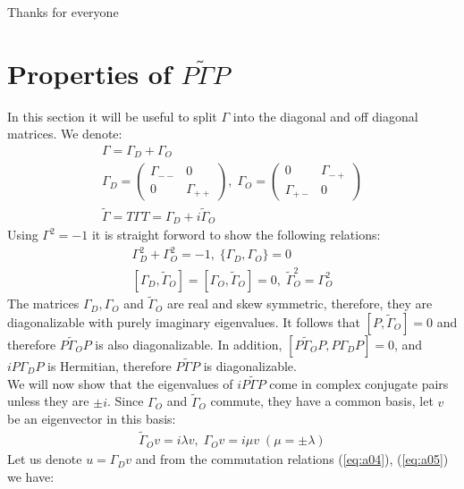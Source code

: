 \documentclass[%
 reprint,
 amsmath,amssymb,
 aps,
]{revtex4-2}
\begin{document}
\begin{acknowledgments}
Thanks for everyone
\end{acknowledgments}

\appendix

\section{Properties of $P\tilde\Gamma P$}
\label{app:p_gamma_p}

In this section it will be useful to split $\Gamma$ into the diagonal and off diagonal matrices. We denote:
\begin{align}
    \Gamma=\Gamma_D + \Gamma_O \\
    \Gamma_D=\begin{pmatrix}\Gamma_{--} & 0 \\ 0 & \Gamma_{++} \end{pmatrix}, \;
    \Gamma_O=\begin{pmatrix}0 & \Gamma_{-+} \\ \Gamma_{+-} & 0 \end{pmatrix} \\
    \tilde\Gamma = T\Gamma T=\Gamma_D + i\tilde\Gamma_O
\end{align}
Using $\Gamma^2=-1$ it is straight forword to show the following relations:
\begin{align}
    \Gamma_D^2 + \Gamma_O^2 = -1, \; \{\Gamma_D,\Gamma_O\}=0 \label{eq:a04} \\
    [\Gamma_D,\tilde\Gamma_O]=[\Gamma_O,\tilde\Gamma_O]=0, \; \tilde\Gamma_O^2=\Gamma_O^2 \label{eq:a05}
\end{align}
The matrices $\Gamma_D,\Gamma_O$ and $\tilde\Gamma_O$ are real and skew symmetric, therefore, they are diagonalizable with purely imaginary eigenvalues. It follows that $[P,\tilde\Gamma_O]=0$ and therefore $P\tilde\Gamma_OP$ is also diagonalizable. In addition, $[P\tilde\Gamma_OP, P\Gamma_DP]=0$, and $iP\Gamma_DP$ is Hermitian, therefore $P\tilde\Gamma P$ is diagonalizable.\\
We will now show that the eigenvalues of $iP\tilde\Gamma P$ come in complex conjugate pairs unless they are $\pm i$. Since $\Gamma_O$ and $\tilde\Gamma_O$ commute, they have a common basis, let $v$ be an eigenvector in this basis:
\begin{align}
    \tilde\Gamma_Ov=i\lambda v, \; \Gamma_Ov=i\mu v \; (\mu=\pm\lambda)
\end{align}
Let us denote $u=\Gamma_Dv$ and from the commutation relations (\ref{eq:a04}), (\ref{eq:a05}) we have:
\end{document}
